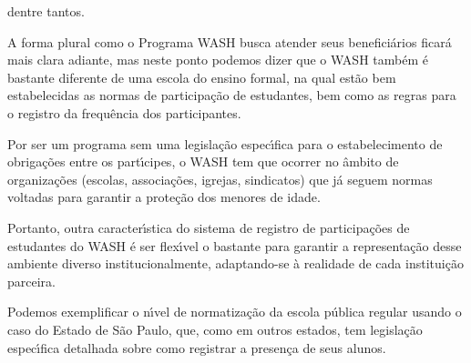 \documentclass[
12pt,		%
openright,	%
twoside,  %
a4paper,			%
chapter=TITLE,		%
english,			%
french,				%
spanish,			%
brazil				%
]{USPSC-classe/USPSC}
\begin{document}
dentre tantos.

















A forma plural como o Programa WASH busca atender seus benefici\'arios ficar\'a mais clara adiante, mas neste ponto podemos dizer que o WASH tamb\'em \'e bastante diferente de uma escola do ensino formal, na qual est\~ao bem estabelecidas as normas de participa\c{c}\~ao de estudantes, bem como as regras para o registro da frequ\^encia dos participantes.

















Por ser um programa sem uma legisla\c{c}\~ao espec\'{\i}fica para o estabelecimento de obriga\c{c}\~oes entre os part\'{\i}cipes, o WASH tem que ocorrer no \^ambito de organiza\c{c}\~oes (escolas, associa\c{c}\~oes, igrejas, sindicatos) que j\'a seguem normas voltadas para garantir a prote\c{c}\~ao dos menores de idade.

















Portanto, outra caracter\'{\i}stica do sistema de registro de participa\c{c}\~oes de estudantes do WASH \'e ser flex\'{\i}vel o bastante para garantir a representa\c{c}\~ao desse ambiente diverso institucionalmente, adaptando-se \`a realidade de cada institui\c{c}\~ao parceira.

















Podemos exemplificar o n\'{\i}vel de normatiza\c{c}\~ao da escola p\'ublica regular usando o caso do Estado de S\~ao Paulo, que, como em outros estados, tem legisla\c{c}\~ao espec\'{\i}fica detalhada sobre como registrar a presen\c{c}a de seus alunos.
\end{document}
